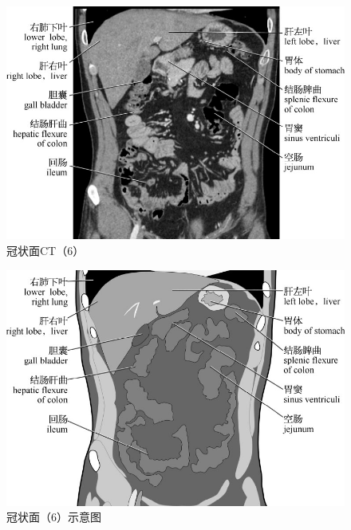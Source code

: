 \begin{figure}[!htbp]
 \centering
 \includegraphics{./images/Image00108.jpg}
 \captionsetup{justification=centering}
 \caption{冠状面CT（6）}
  \end{figure} 
 \FloatBarrier

\begin{figure}[!htbp]
 \centering
 \includegraphics{./images/Image00109.jpg}
 \captionsetup{justification=centering}
 \caption{冠状面（6）示意图}
  \end{figure} 
 \FloatBarrier

